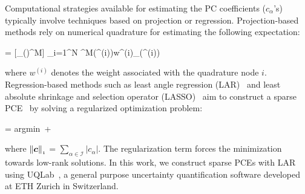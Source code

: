 Computational strategies available for estimating the PC coefficients ($c_\alpha$'s) typically involve
techniques based on projection or regression. Projection-based methods rely on numerical
quadrature for estimating the following expectation:

\be
{} = [\Psi_\alpha(\bm{\xi})\cdot\GG^{\mbox{\tiny{M}}}]
\approx
\sum_{i=1}^{N} \GG^{\mbox{\tiny{M}}}(\bm{\theta}^{(i)})w^{(i)}\Psi_\alpha(\bm{\xi}^{(i)})
\ee

\noindent where $w^{(i)}$ denotes the weight associated with the quadrature node $i$. 
Regression-based methods such as least angle regression (LAR)~\cite{Efron:2004} and least absolute shrinkage
and selection operator (LASSO)~\cite{Tibshirani:1996} aim to construct a sparse PCE~\cite{Blatman:2008}
by solving a regularized optimization problem:

\be
{} = \mbox{argmin}~  + \lambda{}
\ee

\noindent where $\left\| {\bm{c}} \right\|_{\scriptscriptstyle 1}$ = $\sum_{\alpha\in \mathcal{I}} |c_\alpha |$.
The regularization term forces the minimization towards low-rank solutions.
In this work, we construct sparse PCEs with LAR using UQLab~\cite{Marelli:2014},
a general purpose uncertainty quantification software developed at ETH Zurich in Switzerland.


















